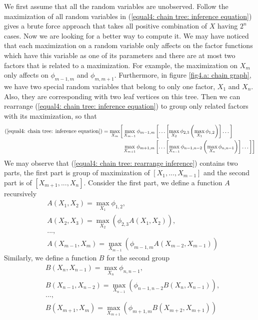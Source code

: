 We first assume that all the random variables are unobserved. Follow the maximization of all random variables in (\ref{equal4: chain tree: inference equation}) gives a brute force approach that takes all positive combination of $X$ having $2^n$ cases. Now we are looking for a better way to compute it. We may have noticed that each maximization on a random variable only affects on the factor functions which have this variable as one of its parameters and there are at most two factors that is related to a maximization. For example, the maximization on $X_m$ only affects on $\phi_{m-1, m}$ and $\phi_{m, m+1}$. Furthermore, in figure \ref{fig4.a: chain graph}, we have two special random variables that belong to only one factor, $X_1$ and $X_n$. Also, they are corresponding with two leaf vertices on this tree. Then we can rearrange (\ref{equal4: chain tree: inference equation}) to group only related factors with its maximization, so that
\begin{align}
	\begin{split}
		(\ref{equal4: chain tree: inference equation}) = \max_{X_m} \biggl[
		& \max_{X_{m-1}}{
			\phi_{m-1, m} \left[ \dots \left[  \max_{X_2}{
				\phi_{2,3} \left( \max_{X_1}{\phi_{1,2}} \right)
			} \right] \dots \right]
		} \\
		& \max_{X_{m+1}}{
			\phi_{m+1, m} \left[ \dots \left[  \max_{X_{n-1}}{
				\phi_{n-1,n-2} \left( \max_{X_n}{\phi_{n,n-1}} \right)
			} \right] \dots \right]
		}
		\biggr]
	\end{split}
	\label{equal4: chain tree: rearrange inference}
\end{align}
We may observe that (\ref{equal4: chain tree: rearrange inference}) contains two parts, the first part is group of maximization of $[X_1, ..., X_{m-1}]$ and the second part is of $[X_{m+1}, ..., X_{n}]$. Consider the first part, we define a function $A$ recursively
\begin{align*}
	& A(X_1, X_2) = \max_{X_1}{\phi_{1,2}}, \\
	& A(X_2, X_3) = \max_{X_2}{\left( \phi_{2,3}A(X_1, X_2) \right)}, \\
	& ..., \\
	& A(X_{m-1}, X_m) = \max_{X_{m-1}}{\left( \phi_{m-1,m}A(X_{m-2}, X_{m-1}) \right)}
\end{align*}
Similarly, we define a function $B$ for the second group
\begin{align*}
	& B(X_n, X_{n-1}) = \max_{X_n}{\phi_{n,n-1}}, \\
	& B(X_{n-1}, X_{n-2}) = \max_{X_{n-1}}{\left( \phi_{n-1,n-2}B(X_{n}, X_{n-1}) \right)}, \\
	& ..., \\
	& B(X_{m+1}, X_m) = \max_{X_{m+1}}{\left( \phi_{m+1,m}B(X_{m+2}, X_{m+1}) \right)}
\end{align*}
